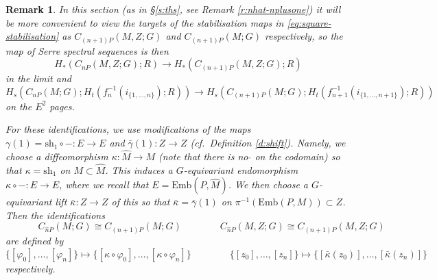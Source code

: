 \documentclass[reqno,a4paper]{article}
\numberwithin{equation}{section}
\theoremstyle{italicised}
\theoremstyle{upright}
\newtheorem{rmk}[thm]{Remark}
\theoremstyle{italicised-restate}
\newcommand{\cf}{\textit{cf}.\ }
\begin{document}
\begin{rmk}\label{r:identifications}
In this section (as in \S\ref{s:ths}, see Remark \ref{r:nhat-nplusone}) it will be more convenient to view the targets of the stabilisation maps in \eqref{eq:square-stabilisation} as $C_{(n+1)P}(M,Z;G)$ and $C_{(n+1)P}(M;G)$ respectively, so the map of Serre spectral sequences is then
\begin{equation}\label{eq:stab-map-labelled}
H_*(C_{nP}(M,Z;G);R) \longrightarrow H_*(C_{(n+1)P}(M,Z;G);R)
\end{equation}
in the limit and
\begin{equation}\label{eq:twisted-stab-map}
H_s(C_{nP}(M;G);H_t(f_n^{-1}(i_{\{1,\ldots,n\}});R)) \longrightarrow H_s(C_{(n+1)P}(M;G);H_t(f_{n+1}^{-1}(i_{\{1,\ldots,n+1\}});R))
\end{equation}
on the $E^2$ pages.

For these identifications, we use modifications of the maps $\gamma(1) = \mathrm{sh}_1 \circ - \colon E \to E$ and $\bar{\gamma}(1) \colon Z \to Z$ (\cf Definition \ref{d:shift}). Namely, we choose a diffeomorphism $\kappa \colon \hat{M} \to M$ (note that there is no $\hat{}$ on the codomain) so that $\kappa = \mathrm{sh}_1$ on $M \subset \hat{M}$. This induces a $G$-equivariant endomorphism $\kappa \circ - \colon E \to E$, where we recall that $E = \mathrm{Emb}(P,\hat{M})$. We then choose a $G$-equivariant lift $\bar{\kappa} \colon Z \to Z$ of this so that $\bar{\kappa} = \bar{\gamma}(1)$ on $\pi^{-1}(\mathrm{Emb}(P,M)) \subset Z$. Then the identifications
\[
\phantom{Z;Z;Z;}C_{\hat{n}P}(M;G) \cong C_{(n+1)P}(M;G) \qquad\qquad C_{\hat{n}P}(M,Z;G) \cong C_{(n+1)P}(M,Z;G)
\]
are defined by
\[
\{[\varphi_0],\ldots,[\varphi_n]\} \longmapsto \{[\kappa \circ \varphi_0],\ldots,[\kappa \circ \varphi_n]\} \qquad\qquad \{[z_0],\ldots,[z_n]\} \longmapsto \{[\bar{\kappa}(z_0)],\ldots,[\bar{\kappa}(z_n)]\}
\]
respectively.
\end{rmk}
\end{document}
